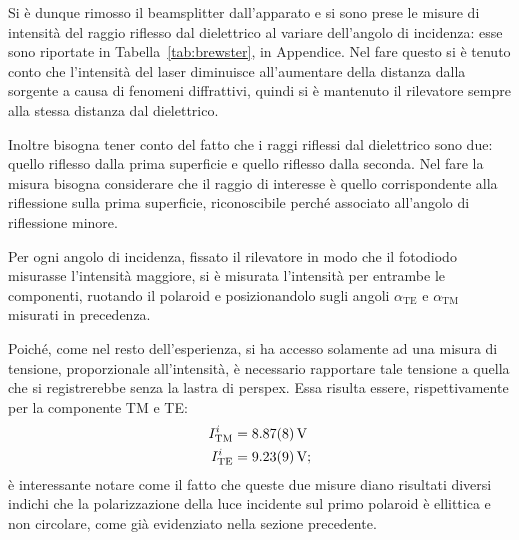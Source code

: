 \documentclass[10pt,oneside,a4paper]{article}
\begin{document}
\begin{multicols}{2}
Si è dunque rimosso il beamsplitter dall'apparato e si sono prese le misure di intensità del raggio riflesso dal dielettrico al variare dell'angolo di incidenza: esse sono riportate in Tabella~\ref{tab:brewster}, in Appendice. Nel fare questo si è tenuto conto che l'intensità del laser diminuisce all'aumentare della distanza dalla sorgente a causa di fenomeni diffrattivi, quindi si è mantenuto il rilevatore sempre alla stessa distanza dal dielettrico.

Inoltre bisogna tener conto del fatto che i raggi riflessi dal dielettrico sono due: quello riflesso dalla prima superficie e quello riflesso dalla seconda. Nel fare la misura bisogna considerare che il raggio di interesse è quello corrispondente alla riflessione sulla prima superficie, riconoscibile perché associato all'angolo di riflessione minore.

Per ogni angolo di incidenza, fissato il rilevatore in modo che il fotodiodo misurasse l'intensità maggiore, si è misurata l'intensità per entrambe le componenti, ruotando il polaroid e posizionandolo sugli angoli $\alpha_{\text{TE}}$ e $\alpha_{\text{TM}}$ misurati in precedenza.

Poiché, come nel resto dell'esperienza, si ha accesso solamente ad una misura di tensione, proporzionale all'intensità, è necessario rapportare tale tensione a quella che si registrerebbe senza la lastra di perspex. Essa risulta essere, rispettivamente per la componente TM e TE:
\[
\begin{aligned}
I_\text{TM}^i &= \SI{8.87 \pm 0.08}{V} \\
I_\text{TE}^i &= \SI{9.23 \pm 0.09}{V};
\end{aligned}
\]
è interessante notare come il fatto che queste due misure diano risultati diversi indichi che la polarizzazione della luce incidente sul primo polaroid è ellittica e non circolare, come già evidenziato nella sezione precedente.




\end{multicols}
\end{document}

